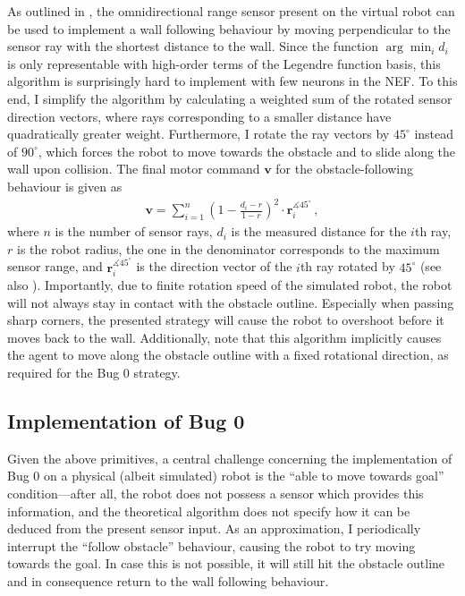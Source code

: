 \documentclass[letterpaper,10pt,conference]{ieeeconf}
\renewcommand{\vec}[1]{\bm{#1}}
\begin{document}
As outlined in \cite{yata1998wall}, the omnidirectional range sensor present on the virtual robot can be used to implement a wall following behaviour by moving perpendicular to the sensor ray with the shortest distance to the wall. Since the function $\arg\min_i d_i$ is only representable with high-order terms of the Legendre function basis, this algorithm is surprisingly hard to implement with few neurons in the NEF. To this end, I simplify the algorithm by calculating a weighted sum of the rotated sensor direction vectors, where rays corresponding to a smaller distance have quadratically greater weight. Furthermore, I rotate the ray vectors by $45^\circ$ instead of $90^\circ$, which forces the robot to move towards the obstacle and to slide along the wall upon collision. The final motor command $\vec v$ for the obstacle-following behaviour is given as
\begin{align*}
	\vec v = \sum_{i = 1}^n \left( 1 - \frac{d_i - r}{1 - r} \right)^2 \cdot \vec r_i^{\measuredangle 45^\circ} \,,
\end{align*}
where $n$ is the number of sensor rays, $d_i$ is the measured distance for the $i$th ray, $r$ is the robot radius, the one in the denominator corresponds to the maximum sensor range, and $\vec r_i^{\measuredangle 45^\circ}$ is the direction vector of the $i$th ray rotated by $45^\circ$ (see also ). Importantly, due to finite rotation speed of the simulated robot, the robot will not always stay in contact with the obstacle outline. Especially when passing sharp corners, the presented strategy will cause the robot to overshoot before it moves back to the wall. Additionally, note that this algorithm implicitly causes the agent to move along the obstacle outline with a fixed rotational direction, as required for the Bug 0 strategy.

\subsection{Implementation of Bug 0}

Given the above primitives, a central challenge concerning the implementation of Bug 0 on a physical (albeit simulated) robot is the \enquote{able to move towards goal} condition---after all, the robot does not possess a sensor which provides this information, and the theoretical algorithm does not specify how it can be deduced from the present sensor input. As an approximation, I periodically interrupt the \enquote{follow obstacle} behaviour, causing the robot to try moving towards the goal. In case this is not possible, it will still hit the obstacle outline and in consequence return to the wall following behaviour.
\end{document}
